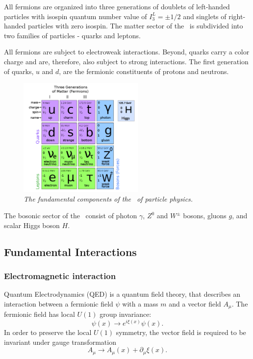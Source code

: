 All fermions are organized into three generations of  doublets of left-handed particles with isospin quantum number value of $I^L_3 = \pm1/2$ and singlets of right-handed particles with zero isospin.
The matter sector of the \sm\ is subdivided into two families of particles - quarks and leptons.

All fermions are subject to electroweak interactions. Beyond, quarks carry a color charge and are, therefore, also subject to strong interactions.
The first generation of quarks, $u$ and $d$, are the fermionic constituents of protons and neutrons. 

\begin{figure}[h]
{\centering
    \includegraphics[width=0.55\textwidth]{graphics/Plots_Standard_Model.png}
    \caption{\sl The fundamental components of the \sm\ of particle physics.}
    \label{fig:ComponentsSM}
  }
\end{figure}

The bosonic sector of the \sm\ consist of photon $\gamma$, $Z^0$ and $W^\pm$ bosons, gluons $g$, and scalar Higgs boson $H$.
 


\subsection{Fundamental Interactions}
\subsubsection{Electromagnetic interaction}
\label{sec:QED_SM}
Quantum Electrodynamics (QED) is a quantum field theory, that describes an interaction between a fermionic field $\psi$ with a mass $m$ and a vector field $A_\mu$. 
The fermionic field has local $U(1)$ group invariance: %
\begin{equation}
	\psi(x) \to e^{i\xi (x)}\psi(x).
\end{equation}
In order to preserve the local $U(1)$ symmetry, the vector field is required to be invariant under gauge transformation
\begin{equation}
A_\mu \to A_\mu (x) + \partial_\mu \xi(x).
\end{equation} 

